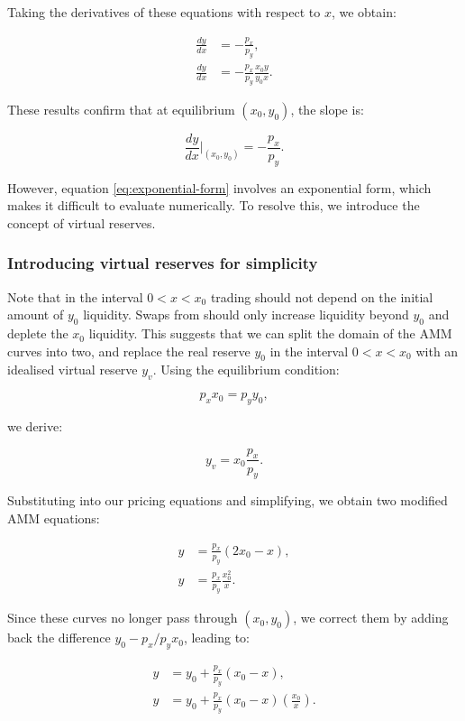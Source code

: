 \documentclass{article}
\begin{document}
Taking the derivatives of these equations with respect to \( x \), we obtain:

\begin{align}
    \frac{dy}{dx} &= -\frac{p_x}{p_y}, \\
    \frac{dy}{dx} &= -\frac{p_x}{p_y} \frac{x_0 y}{y_0 x}.
\end{align}

These results confirm that at equilibrium \( (x_0, y_0) \), the slope is:

\[
\frac{dy}{dx} \Big|_{(x_0, y_0)} = -\frac{p_x}{p_y}.
\]

However, equation \eqref{eq:exponential-form} involves an exponential form, which makes it difficult to evaluate numerically. To resolve this, we introduce the concept of virtual reserves.

\subsubsection{Introducing virtual reserves for simplicity}

Note that in the interval $0 < x < x_0$ trading should not depend on the initial amount of $y_0$ liquidity. Swaps from should only increase liquidity beyond $y_0$ and deplete the $x_0$ liquidity. This suggests that we can split the domain of the AMM curves into two, and replace the real reserve $y_0$ in the interval $0 < x < x_0$ with an idealised virtual reserve $y_v$. Using the equilibrium condition:

\[
p_x x_0 = p_y y_0,
\]

we derive:

\[
y_v = x_0 \frac{p_x}{p_y}.
\]

Substituting into our pricing equations and simplifying, we obtain two modified AMM equations:

\begin{align}
    y &= \frac{p_x}{p_y} (2x_0 - x), \\
    y &= \frac{p_x}{p_y} \frac{x_0^2}{x}.
\end{align}

Since these curves no longer pass through \( (x_0, y_0) \), we correct them by adding back the difference \( y_0 - p_x / p_y x_0 \), leading to:

\begin{align}
    y &= y_0 + \frac{p_x}{p_y} (x_0 - x), \\
    y &= y_0 + \frac{p_x}{p_y} (x_0 - x) \left( \frac{x_0}{x} \right).
\end{align}
\end{document}
